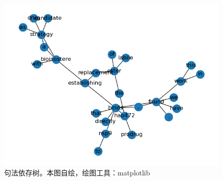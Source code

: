 \documentclass[twocolumn]{article}
\begin{document}
\begin{figure}[ht!]
	\centering
	\includegraphics[width=\textwidth]{figure/sdp.png}
	\caption{句法依存树。本图自绘，绘图工具：matplotlib}
	\label{fig:sdp}
\end{figure}
\end{document}
